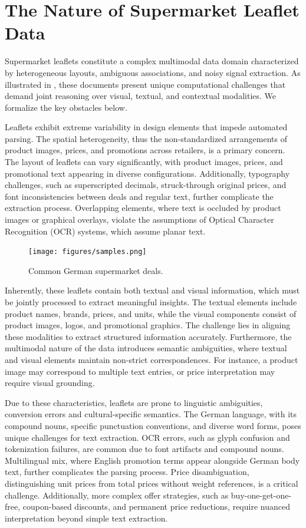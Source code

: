 \documentclass[11pt]{article}
\begin{document}
\section{The Nature of Supermarket Leaflet Data}  
Supermarket leaflets constitute a complex multimodal data domain characterized by heterogeneous layouts, ambiguous associations, and noisy signal extraction. As illustrated in , these documents present unique computational challenges that demand joint reasoning over visual, textual, and contextual modalities. We formalize the key obstacles below.

Leaflets exhibit extreme variability in design elements that impede automated parsing. The spatial heterogeneity, thus the non-standardized arrangements of product images, prices, and promotions across retailers, is a primary concern. The layout of leaflets can vary significantly, with product images, prices, and promotional text appearing in diverse configurations. Additionally, typography challenges, such as superscripted decimals, struck-through original prices, and font inconsistencies between deals and regular text, further complicate the extraction process. Overlapping elements, where text is occluded by product images or graphical overlays, violate the assumptions of Optical Character Recognition (OCR) systems, which assume planar text.

\begin{figure}[h!]
    \centering
    \texttt{[image: figures/samples.png]}
    \caption{Common German supermarket deals.}
    \label{fig:leaflet_data_samples}
\end{figure}

Inherently, these leaflets contain both textual and visual information, which must be jointly processed to extract meaningful insights. The textual elements include product names, brands, prices, and units, while the visual components consist of product images, logos, and promotional graphics. The challenge lies in aligning these modalities to extract structured information accurately. Furthermore, the multimodal nature of the data introduces semantic ambiguities, where textual and visual elements maintain non-strict correspondences. For instance, a product image may correspond to multiple text entries, or price interpretation may require visual grounding.

Due to these characteristics, leaflets are prone to linguistic ambiguities, conversion errors and cultural-specific semantics. The German language, with its compound nouns, specific punctuation conventions, and diverse word forms, poses unique challenges for text extraction. OCR errors, such as glyph confusion and tokenization failures, are common due to font artifacts and compound nouns. Multilingual mix, where English promotion terms appear alongside German body text, further complicates the parsing process. Price disambiguation, distinguishing unit prices from total prices without weight references, is a critical challenge. Additionally, more complex offer strategies, such as buy-one-get-one-free, coupon-based discounts, and permanent price reductions, require nuanced interpretation beyond simple text extraction.
\end{document}
